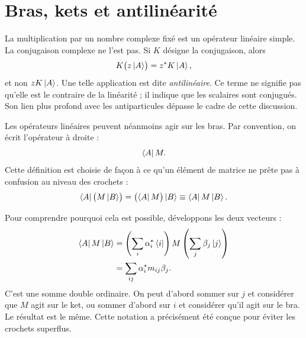 \begin{classroomqa}\end{classroomqa}

\section{Bras, kets et antilinéarité}

\begin{classroomqa}\end{classroomqa}

La multiplication par un nombre complexe fixé est un opérateur linéaire simple. La conjugaison complexe ne l’est pas. Si \(K\) désigne la conjugaison, alors
\[
K\bigl(z\left\lvert A\right\rangle\bigr)=z^*K\left\lvert A\right\rangle,
\]
et non \(zK\left\lvert A\right\rangle\). Une telle application est dite \emph{antilinéaire}. Ce terme ne signifie pas qu’elle est le contraire de la linéarité ; il indique que les scalaires sont conjugués. Son lien plus profond avec les antiparticules dépasse le cadre de cette discussion.

Les opérateurs linéaires peuvent néanmoins agir sur les bras. Par convention, on écrit l’opérateur à droite :
\begin{equation}
\left\langle A\right\rvert M.
\end{equation}
Cette définition est choisie de façon à ce qu’un élément de matrice ne prête pas à confusion au niveau des crochets :
\begin{equation}
\left\langle A\right\rvert\bigl(M\left\lvert B\right\rangle\bigr)
=
\bigl(\left\langle A\right\rvert M\bigr)\left\lvert B\right\rangle
\equiv
\left\langle A\right\rvert M\left\lvert B\right\rangle.
\label{eq:bracket-independence}
\end{equation}

Pour comprendre pourquoi cela est possible, développons les deux vecteurs :
\begin{align}
\left\langle A\right\rvert M\left\lvert B\right\rangle
 &=\left(\sum_i\alpha_i^*\left\langle i\right\rvert\right)
   M
   \left(\sum_j\beta_j\left\lvert j\right\rangle\right)\\
 &=\sum_{ij}\alpha_i^*m_{ij}\beta_j.
\label{eq:matrix-element-double-sum}
\end{align}
C’est une somme double ordinaire. On peut d’abord sommer sur \(j\) et considérer que \(M\) agit sur le ket, ou sommer d’abord sur \(i\) et considérer qu’il agit sur le bra. Le résultat est le même. Cette notation a précisément été conçue pour éviter les crochets superflus.

